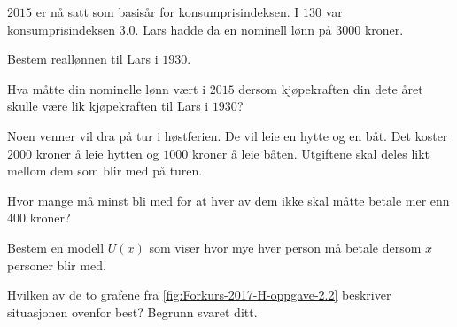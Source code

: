 \Oppgave[3]

$2015$ er nå satt som basisår for konsumprisindeksen. I $130$ var
konsumprisindeksen $\num{3,0}$. Lars hadde da en nominell lønn på $3000$ kroner.

\begin{oppgaver}
   Bestem reallønnen til Lars i $1930$.
\end{oppgaver}

\begin{oppgaver}
   Hva måtte din nominelle lønn vært i $2015$ dersom kjøpekraften din
  dete året skulle være lik kjøpekraften til Lars i $1930$?
\end{oppgaver}

\Oppgave[3]

Noen venner vil dra på tur i høstferien. De vil leie en hytte og en båt. Det
koster $2000$ kroner å leie hytten og $1000$ kroner å leie båten. Utgiftene skal
deles likt mellom dem som blir med på turen.

\begin{oppgaver}
   Hvor mange må minst bli med for at hver av dem ikke skal måtte betale
  mer enn 400 kroner?
\end{oppgaver}

\begin{oppgaver}
   Bestem en modell $U(x)$ som viser hvor mye hver person må betale
  dersom $x$ personer blir med.
\end{oppgaver}

\begin{oppgaver}
   Hvilken av de to grafene fra \cref{fig:Forkurs-2017-H-oppgave-2.2}
  beskriver situasjonen ovenfor best? Begrunn svaret ditt.
\end{oppgaver}

